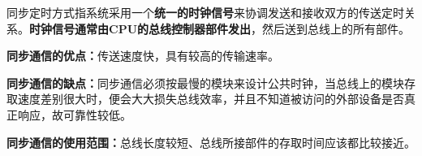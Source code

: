 同步定时方式指系统采用一个{\textbf{统一的时钟信号}}来协调发送和接收双方的传送定时关系。\textbf{时钟信号通常由CPU的总线控制器部件发出}，然后送到总线上的所有部件。

\textbf{同步通信的优点：}传送速度快，具有较高的传输速率。

\textbf{同步通信的缺点：}同步通信必须按最慢的模块来设计公共时钟，当总线上的模块存取速度差别很大时，便会大大损失总线效率，并且不知道被访问的外部设备是否真正响应，故可靠性较低。

\textbf{同步通信的使用范围：}总线长度较短、总线所接部件的存取时间应该都比较接近。
